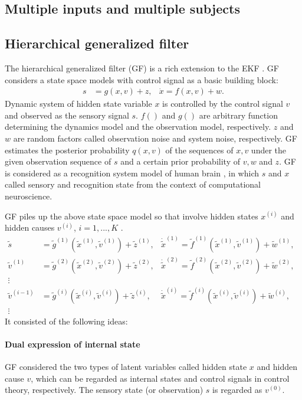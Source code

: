 \documentclass{article}
\begin{document}
\subsection{Multiple inputs and multiple subjects}



\subsection{Hierarchical generalized filter}
The hierarchical generalized filter (GF) is a rich extension to the EKF \cite{GF}.
GF considers a state space models with control signal as a basic building block:
\begin{align*}
s &= g(x,v)+z,& \dot{x} = f(x,v)+w.
\end{align*}
Dynamic system of hidden state variable $x$
is controlled by the control signal $v$
and observed as the sensory signal $s$.
$f()$ and $g()$ are arbitrary function determining
the dynamics model and the observation model, respectively.
$z$ and $w$ are random factors called
observation noise and system noise, respectively.
GF estimates the posterior probability $q(x,v)$
of the sequences of $x,v$ under the given observation sequence of $s$
and a certain prior probability of $v,w$ and $z$.
GF is considered as a recognition system model of human brain \cite{GFGF},
in which $s$ and $x$ called sensory and recognition state
from the context of computational neuroscience.

GF piles up the above state space model 
so that involve hidden states
$x^{(i)}$ and hidden causes $v^{(i)}$, $i=1,...,K$
\cite{Generalized_filter}.
\begin{align}
 \tilde{s} &= \tilde{g}^{(1)}( \tilde{x}^{(1)}, \tilde{v}^{(1)}  ) + \tilde{z}^{(1)},
 &
 \dot{\tilde{x}}^{(1)} = \tilde{f}^{(1)}( \tilde{x}^{(1)}, \tilde{v}^{(1)}  ) + \tilde{w}^{(1)},\\
 \tilde{v}^{(1)} &= \tilde{g}^{(2)}( \tilde{x}^{(2)}, \tilde{v}^{(2)}  ) + \tilde{z}^{(2)},
 &
 \dot{\tilde{x}}^{(2)} = \tilde{f}^{(2)}( \tilde{x}^{(2)}, \tilde{v}^{(2)}  ) + \tilde{w}^{(2)},\\
 \vdots&&&\\
 \tilde{v}^{(i-1)} &= \tilde{g}^{(i)}( \tilde{x}^{(i)}, \tilde{v}^{(i)}  ) + \tilde{z}^{(i)},
 &
 \dot{\tilde{x}}^{(i)} = \tilde{f}^{(i)}( \tilde{x}^{(i)}, \tilde{v}^{(i)}  ) + \tilde{w}^{(i)},\\
 \vdots&&&
\end{align}
It consisted of the following ideas:
\paragraph{Dual expression of internal state}
GF considered the two types of latent variables called hidden state $x$ and hidden cause $v$,
which can be regarded as internal states and control signals in control theory, respectively.
The sensory state (or observation) $s$ is regarded as $v^{(0)}$.
\end{document}
